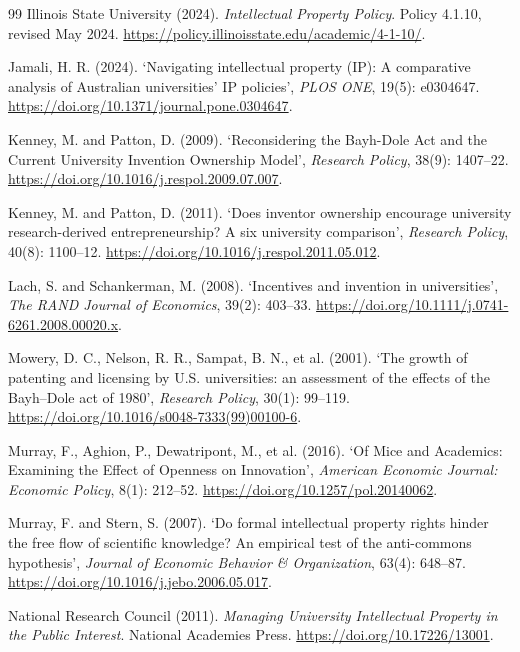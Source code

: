 \begin{thebibliography}{99}
 Illinois State University (2024). \emph{Intellectual Property Policy}. Policy 4.1.10, revised May 2024. \url{https://policy.illinoisstate.edu/academic/4-1-10/}.

 Jamali, H. R. (2024). `Navigating intellectual property (IP): A comparative analysis of Australian universities’ IP policies', \emph{PLOS ONE}, 19(5): e0304647. \url{https://doi.org/10.1371/journal.pone.0304647}.

 Kenney, M. and Patton, D. (2009). `Reconsidering the Bayh-Dole Act and the Current University Invention Ownership Model', \emph{Research Policy}, 38(9): 1407--22. \url{https://doi.org/10.1016/j.respol.2009.07.007}.

 Kenney, M. and Patton, D. (2011). `Does inventor ownership encourage university research-derived entrepreneurship? A six university comparison', \emph{Research Policy}, 40(8): 1100--12. \url{https://doi.org/10.1016/j.respol.2011.05.012}.

 Lach, S. and Schankerman, M. (2008). `Incentives and invention in universities', \emph{The RAND Journal of Economics}, 39(2): 403--33. \url{https://doi.org/10.1111/j.0741-6261.2008.00020.x}.

 Mowery, D. C., Nelson, R. R., Sampat, B. N., et al. (2001). `The growth of patenting and licensing by U.S. universities: an assessment of the effects of the Bayh–Dole act of 1980', \emph{Research Policy}, 30(1): 99--119. \url{https://doi.org/10.1016/s0048-7333(99)00100-6}.

 Murray, F., Aghion, P., Dewatripont, M., et al. (2016). `Of Mice and Academics: Examining the Effect of Openness on Innovation', \emph{American Economic Journal: Economic Policy}, 8(1): 212--52. \url{https://doi.org/10.1257/pol.20140062}.

 Murray, F. and Stern, S. (2007). `Do formal intellectual property rights hinder the free flow of scientific knowledge? An empirical test of the anti-commons hypothesis', \emph{Journal of Economic Behavior \& Organization}, 63(4): 648--87. \url{https://doi.org/10.1016/j.jebo.2006.05.017}.

 National Research Council (2011). \emph{Managing University Intellectual Property in the Public Interest}. National Academies Press. \url{https://doi.org/10.17226/13001}.


\end{thebibliography}
